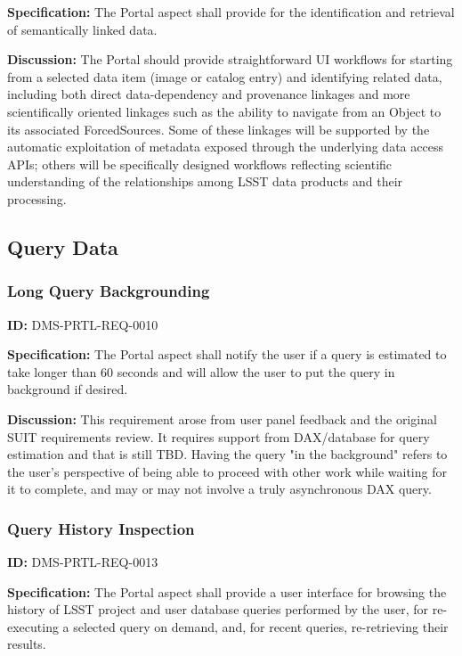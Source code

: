 \documentclass[SE,toc,lsstdraft]{lsstdoc}
\begin{document}
\textbf{Specification:}
The Portal aspect shall provide for the identification and retrieval of semantically linked data.

\textbf{Discussion:}
The Portal should provide straightforward UI workflows for starting from a selected data item (image or catalog entry) and identifying related data, including both direct data-dependency and provenance linkages and more scientifically oriented linkages such as the ability to navigate from an Object to its associated ForcedSources.
Some of these linkages will be supported by the automatic exploitation of metadata exposed through the underlying data access APIs; others will be specifically designed workflows reflecting scientific understanding of the relationships among LSST data products and their processing.

\subsection{Query Data}

\subsubsection{Long Query Backgrounding}

\label{DMS-PRTL-REQ-0010}
\textbf{ID:} DMS-PRTL-REQ-0010

\textbf{Specification:}
The Portal aspect shall notify the user if a query is estimated to take longer than 60 seconds and will allow the user to put the query in background if desired.

\textbf{Discussion:}
This requirement arose from user panel feedback and the original SUIT requirements review.  It requires support from DAX/database for query estimation and that is still TBD.  Having the query "in the background" refers to the user's perspective of being able to proceed with other work while waiting for it to complete, and may or may not involve a truly asynchronous DAX query.

\subsubsection{Query History Inspection}

\label{DMS-PRTL-REQ-0013}
\textbf{ID:} DMS-PRTL-REQ-0013

\textbf{Specification:}
The Portal aspect shall provide a user interface for browsing the history of LSST project and user database queries performed by the user, for re-executing a selected query on demand, and, for recent queries, re-retrieving their results.
\end{document}
